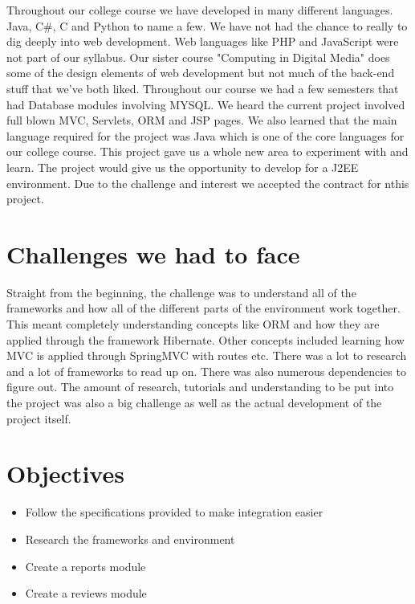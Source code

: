 Throughout our college course we have developed in many different languages. Java, C\#, C and Python to name a few. We have not had the chance to really to dig deeply into web development. Web languages like PHP and JavaScript were not part of our syllabus. Our sister course "Computing in Digital Media" does some of the design elements of web development but not much of the back-end stuff that we've both liked. Throughout our course we had a few semesters that had Database modules involving MYSQL. We heard the current project involved full blown MVC, Servlets, ORM and JSP pages. We also learned that the main language required for the project was Java which is one of the core languages for our college course. This project gave us a whole new area to experiment with and learn. The project would give us the opportunity to develop for a J2EE environment. Due to the challenge and interest we accepted the contract for nthis project.

\section{Challenges we had to face}    

Straight from the beginning, the challenge was to understand all of the frameworks and how all of the different parts of the environment work together. This meant completely understanding concepts like ORM and how they are applied through the framework Hibernate. Other concepts included learning how MVC is applied through SpringMVC with routes etc. There was a lot to research and a lot of frameworks to read up on. There was also numerous dependencies to figure out. The amount of research, tutorials and understanding to be put into the project was also a big challenge as well as the actual development of the project itself. 


\section{Objectives}

\begin{itemize}
\item{Follow the specifications provided to make integration easier}
\item{Research the frameworks and environment}
\item{Create a reports module}
\item{Create a reviews module}
\end{itemize}

